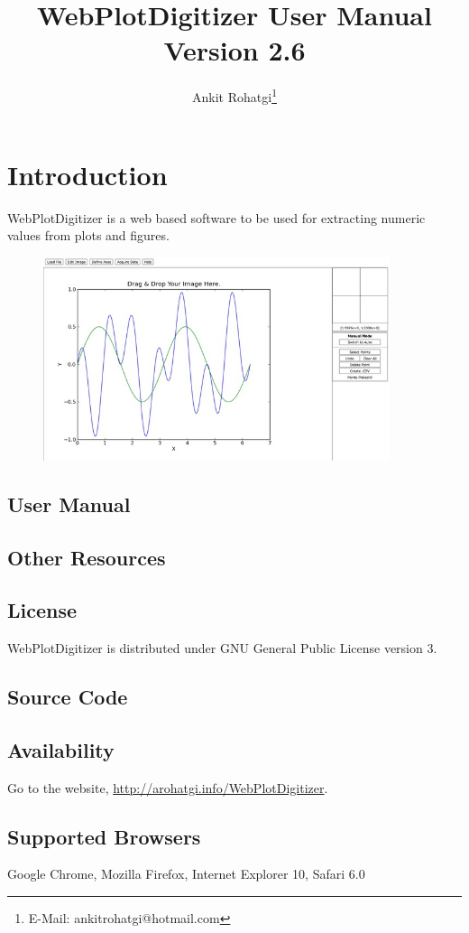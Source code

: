 \documentclass{article}
\begin{document}
\title{WebPlotDigitizer User Manual\\ Version 2.6}
\author{Ankit Rohatgi\footnote{E-Mail: ankitrohatgi@hotmail.com}}
\maketitle
\tableofcontents

\section{Introduction}
WebPlotDigitizer is a web based software to be used for extracting numeric values from plots and figures.

\begin{figure}
\centering
\includegraphics[width=4in]{./figures/testSmall.jpg}
\end{figure}
\subsection{User Manual}
\subsection{Other Resources}
\subsection{License}
WebPlotDigitizer is distributed under GNU General Public License version 3.
\subsection{Source Code}
\subsection{Availability}
Go to the website, \url{http://arohatgi.info/WebPlotDigitizer}.
\subsection{Supported Browsers}
Google Chrome, Mozilla Firefox, Internet Explorer 10, Safari 6.0
\end{document}
